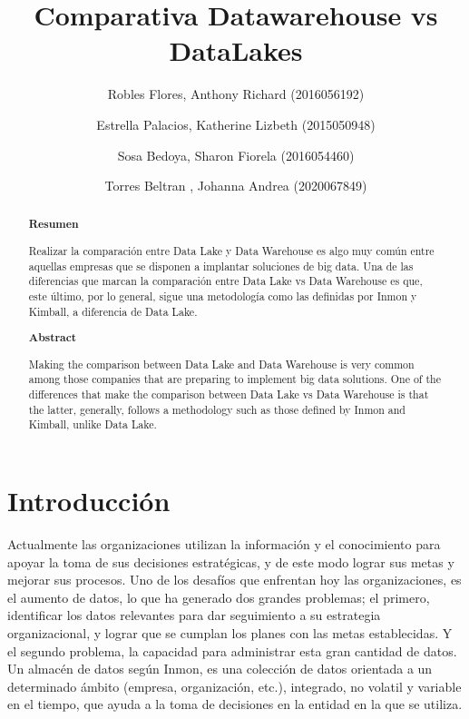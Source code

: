 \documentclass[%
 reprint,
 amsmath,amssymb,
 aps,
]{revtex4-1}
\begin{document}
\title{Comparativa Datawarehouse vs DataLakes}
\author{Robles Flores, Anthony Richard	               (2016056192)}
\author{Estrella Palacios, Katherine Lizbeth			(2015050948)}
\author{Sosa Bedoya, Sharon Fiorela					(2016054460)}
\author{Torres Beltran , Johanna Andrea				(2020067849)}

		
%

\begin{abstract}
\begin{center}
\textbf{Resumen}
\end{center}
Realizar la comparación entre Data Lake y Data Warehouse es algo muy común entre aquellas empresas que se disponen a implantar soluciones de big data. Una de las diferencias que marcan la comparación entre Data Lake vs Data Warehouse es que, este último, por lo general, sigue una metodología como las definidas por Inmon y Kimball, a diferencia de Data Lake.
\\

\begin{center}
\textbf{Abstract}
\end{center}
Making the comparison between Data Lake and Data Warehouse is very common among those companies that are preparing to implement big data solutions. One of the differences that make the comparison between Data Lake vs Data Warehouse is that the latter, generally, follows a methodology such as those defined by Inmon and Kimball, unlike Data Lake.
\\
\end{abstract}



\maketitle


\section {Introducción}\label{sec:1}

Actualmente las organizaciones utilizan la información y el conocimiento para apoyar la toma de sus decisiones estratégicas, y de este modo lograr sus metas y mejorar sus procesos.
Uno de los desafíos que enfrentan hoy las organizaciones, es el aumento de datos, lo que ha generado dos grandes problemas; el primero, identificar los datos relevantes para dar seguimiento a su estrategia organizacional, y lograr que se cumplan los planes con las metas establecidas.
 Y el segundo problema, la capacidad para administrar esta gran cantidad de datos.
Un almacén de datos  según Inmon, es una colección de datos orientada a un determinado ámbito (empresa, organización, etc.), integrado, no volatil y variable en el tiempo, que ayuda a la toma de decisiones en la entidad en la que se utiliza. 
 \cite{estrella1}
\end{document}
